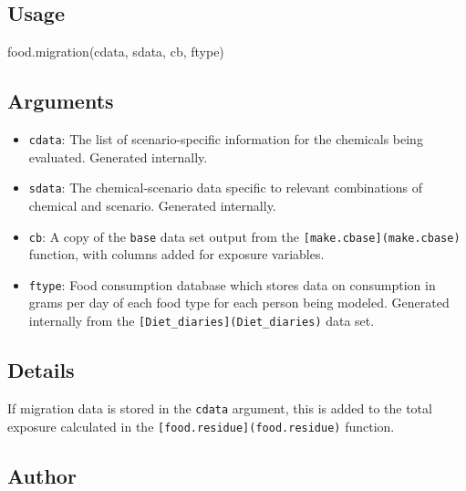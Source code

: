 \documentclass[
]{article}
\newenvironment{Shaded}{\begin{snugshade}}{\end{snugshade}}
\newcommand{\FunctionTok}[1]{\textcolor[rgb]{0.00,0.00,0.00}{#1}}
\newcommand{\NormalTok}[1]{#1}
\providecommand{\tightlist}{%
  \setlength{\itemsep}{0pt}\setlength{\parskip}{0pt}}
\begin{document}
\hypertarget{usage-22}{%
\subsection{Usage}\label{usage-22}}

\begin{Shaded}
\begin{Highlighting}[]
\FunctionTok{food.migration}\NormalTok{(cdata, sdata, cb, ftype)}
\end{Highlighting}
\end{Shaded}

\hypertarget{arguments-19}{%
\subsection{Arguments}\label{arguments-19}}

\begin{itemize}
\tightlist
\item
  \texttt{cdata}: The list of scenario-specific information for the
  chemicals being evaluated. Generated internally.
\item
  \texttt{sdata}: The chemical-scenario data specific to relevant
  combinations of chemical and scenario. Generated internally.
\item
  \texttt{cb}: A copy of the \texttt{base} data set output from the
  \texttt{{[}make.cbase{]}(make.cbase)} function, with columns added for
  exposure variables.
\item
  \texttt{ftype}: Food consumption database which stores data on
  consumption in grams per day of each food type for each person being
  modeled. Generated internally from the
  \texttt{{[}Diet\_diaries{]}(Diet\_diaries)} data set.
\end{itemize}

\hypertarget{details-15}{%
\subsection{Details}\label{details-15}}

If migration data is stored in the \texttt{cdata} argument, this is
added to the total exposure calculated in the
\texttt{{[}food.residue{]}(food.residue)} function.

\hypertarget{author-16}{%
\subsection{Author}\label{author-16}}
\end{document}

